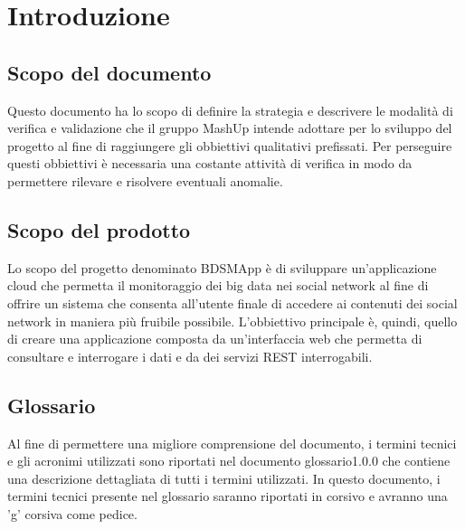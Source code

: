 %


\section{Introduzione}
\subsection{Scopo del documento}
Questo documento ha lo scopo di definire la strategia e descrivere le modalità di verifica e validazione che il gruppo MashUp intende adottare per lo sviluppo del progetto al fine di raggiungere gli obbiettivi qualitativi prefissati. Per perseguire questi obbiettivi è necessaria una costante attività di verifica in modo da permettere rilevare e risolvere eventuali anomalie.

\subsection{Scopo del prodotto}
Lo scopo del progetto denominato BDSMApp è di sviluppare un'applicazione cloud che permetta il monitoraggio dei big data nei social network al fine di offrire un sistema che consenta all'utente finale di accedere ai contenuti dei social network in maniera più fruibile possibile. L'obbiettivo principale è, quindi, quello di creare una applicazione composta da un'interfaccia web che permetta di consultare e interrogare i dati e da dei servizi REST interrogabili.

\subsection{Glossario}
Al fine di permettere una migliore comprensione del documento, i termini tecnici e gli acronimi utilizzati sono riportati nel documento glossario1.0.0 che contiene una descrizione dettagliata di tutti i termini utilizzati. In questo documento, i termini tecnici presente nel glossario saranno riportati in corsivo e avranno una 'g' corsiva come pedice.

